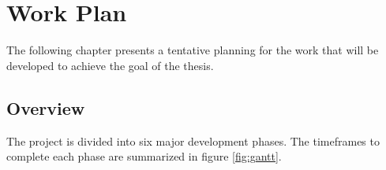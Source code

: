 

\chapter{Work Plan}
\label{cha:work_plan}

The following chapter presents a tentative planning for the work that will be developed to achieve the goal of the thesis.


\section{Overview}

The project is divided into six major development phases. The timeframes to complete each phase are summarized in figure \ref{fig:gantt}.


